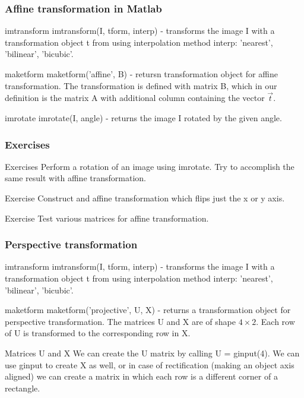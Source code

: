 \documentclass{beamer}
\begin{document}
\begin{frame}
\frametitle{Affine transformation in Matlab}
\begin{block}{imtransform}
imtransform(I, tform, interp) - transforms the image I with a transformation object t from using interpolation method interp: 'nearest', 'bilinear', 'bicubic'.
\end{block}

\begin{block}{maketform}
maketform('affine', B) - retursn transformation object for affine transformation. The transformation is defined with matrix B, which in our definition is the matrix A with additional column containing the vector $\vec{t}$.
\end{block}

\begin{block}{imrotate}
imrotate(I, angle) - returns the image I rotated by the given angle.
\end{block}
\end{frame}


\begin{frame}
\frametitle{Exercises}
\begin{block}{Exercises}
Perform a rotation of an image using imrotate. Try to accomplish the same result with affine transformation.
\end{block}

\begin{block}{Exercise}
Construct and affine transformation which flips just the x or y axis.
\end{block}

\begin{block}{Exercise}
Test various matrices for affine transformation.
\end{block}
\end{frame}


\begin{frame}
\frametitle{Perspective transformation}
\begin{block}{imtransform}
imtransform(I, tform, interp) - transforms the image I with a transformation object t from using interpolation method interp: 'nearest', 'bilinear', 'bicubic'.
\end{block}

\begin{block}{maketform}
maketform('projective', U, X) - returns a transformation object for perspective transformation. The matrices U and X are of shape $4 \times 2$. Each row of U is transformed to the corresponding row in X.
\end{block}

\begin{block}{Matrices U and X}
We can create the U matrix by calling U = ginput(4). We can use ginput to create X as well, or in case of rectification (making an object axis aligned) we can create a matrix in which each row is a different corner of a rectangle.
\end{block}
\end{frame}
\end{document}
